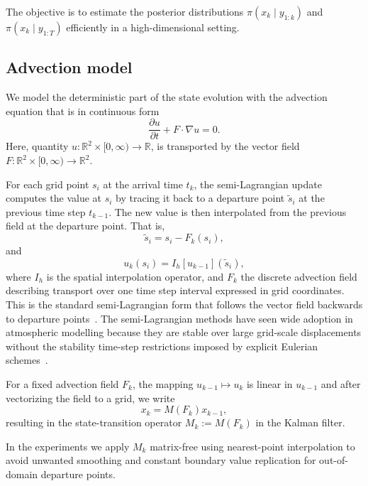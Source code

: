 \documentclass[a4paper,12pt]{article}
\begin{document}
The objective is to estimate the posterior distributions $\pi(x_k \mid y_{1:k})$ and $\pi(x_k \mid y_{1:T})$ efficiently in a high-dimensional setting.

\subsection{Advection model}
We model the deterministic part of the state evolution with the advection equation that is in continuous form
\begin{equation}\label{eq:adv}
    \frac{\partial u}{\partial t} + F \cdot \nabla u = 0.
\end{equation}
Here, quantity $u: \mathbb{R}^2 \times [0, \infty)  \rightarrow \mathbb{R}$, is transported by the vector field $F: \mathbb{R}^2 \times [0, \infty) \rightarrow \mathbb{R}^2$.


For each grid point $s_i$ at the arrival time $t_k$, the semi-Lagrangian update computes the value at $s_i$ by tracing it back to a departure point $\tilde{s}_i$ at the previous time step $t_{k-1}$.
The new value is then interpolated from the previous field at the departure point.
That is,
\begin{equation}
    \tilde{s}_i = s_i - F_k(s_i),
\end{equation}
and
\begin{equation}
    u_k(s_i) = I_h [u_{k-1}](\tilde{s}_i),
\end{equation}
where $I_h$ is the spatial interpolation operator, and $F_k$ the discrete advection field describing transport over one time step interval expressed in grid coordinates.
This is the standard semi-Lagrangian form that follows the vector field backwards to departure points~\cite[Chap.~7]{durran}.
The semi-Lagrangian methods have seen wide adoption in atmospheric modelling because they are stable over large grid-scale displacements without the stability time-step restrictions imposed by explicit Eulerian schemes~\cite{diamantakis}.

For a fixed advection field $F_k$, the mapping $u_{k-1} \mapsto u_{k}$ is linear in $u_{k-1}$ and after vectorizing the field to a grid, we write
\begin{equation}
    x_k = M(F_k) x_{k-1},
\end{equation}
resulting in the state-transition operator $M_k := M(F_k)$ in the Kalman filter.

In the experiments we apply $M_k$ matrix-free using nearest-point interpolation to avoid unwanted smoothing and constant boundary value replication for out-of-domain departure points.
\end{document}
